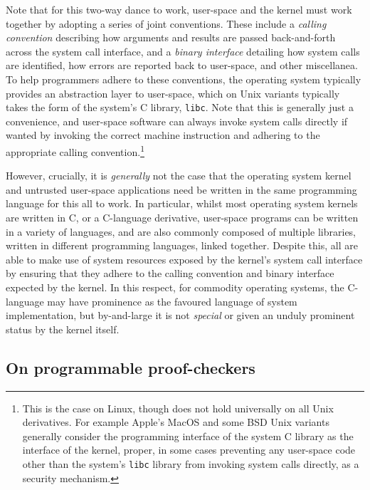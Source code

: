 \documentclass[a4paper, UKenglish, cleveref, autoref, thm-restate, colorlinks]{lipics-v2021}
\begin{document}
Note that for this two-way dance to work, user-space and the kernel must work together by adopting a series of joint conventions.
These include a \emph{calling convention} describing how arguments and results are passed back-and-forth across the system call interface, and a \emph{binary interface} detailing how system calls are identified, how errors are reported back to user-space, and other miscellanea.
To help programmers adhere to these conventions, the operating system typically provides an abstraction layer to user-space, which on Unix variants typically takes the form of the system's C library, \texttt{libc}.
Note that this is generally just a convenience, and user-space software can always invoke system calls directly if wanted by invoking the correct machine instruction and adhering to the appropriate calling convention.\footnote{This is the case on Linux, though does not hold universally on all Unix derivatives.  For example Apple's MacOS and some BSD Unix variants generally consider the programming interface of the system C library as the interface of the kernel, proper, in some cases preventing any user-space code other than the system's \texttt{libc} library from invoking system calls directly, as a security mechanism.}

However, crucially, it is \emph{generally} not the case that the operating system kernel and untrusted user-space applications need be written in the same programming language for this all to work.
In particular, whilst most operating system kernels are written in C, or a C-language derivative, user-space programs can be written in a variety of languages, and are also commonly composed of multiple libraries, written in different programming languages, linked together.
Despite this, all are able to make use of system resources exposed by the kernel's system call interface by ensuring that they adhere to the calling convention and binary interface expected by the kernel.
In this respect, for commodity operating systems, the C-language may have prominence as the favoured language of system implementation, but by-and-large it is not \emph{special} or given an unduly prominent status by the kernel itself.

\subsection{On programmable proof-checkers}
\end{document}
